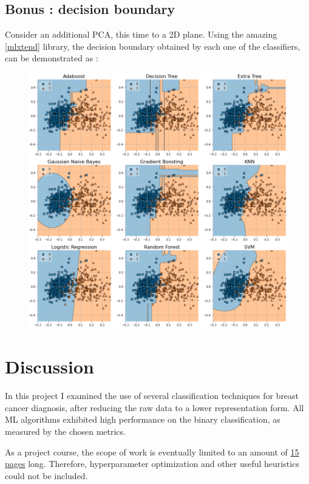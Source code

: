 \documentclass[12pt]{article}
\numberwithin{equation}{section}
\begin{document}
\begin{flushleft}
\subsection{Bonus : decision boundary}
Consider an additional PCA, this time to a 2D plane. Using the amazing [\href{http://rasbt.github.io/mlxtend/user_guide/plotting/plot_decision_regions/}{mlxtend}] library, the decision boundary obtained by each one of the classifiers, can be demonstrated as :
\begin{figure}[H]
\centering
\includegraphics[width=0.985 \linewidth, center]{Decision.png}
\end{figure}




\newpage

\section{Discussion}
In this project I examined the use of several classification techniques for breast cancer diagnosis, after reducing the raw data to a lower representation form. All ML algorithms exhibited high performance on the binary classification, as measured by the chosen metrics.

As a project course, the scope of work is eventually limited to an amount of \underline{15 pages} long. Therefore, hyperparameter optimization and other useful heuristics could not be included.


\end{flushleft}
\end{document}
